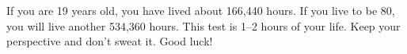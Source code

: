 
If you are 19 years old, you have lived about 166,440 hours. If you live to be 80, you will live another 534,360 hours. This test is 1–2 hours of your life. Keep your perspective and don't sweat it. Good luck!
